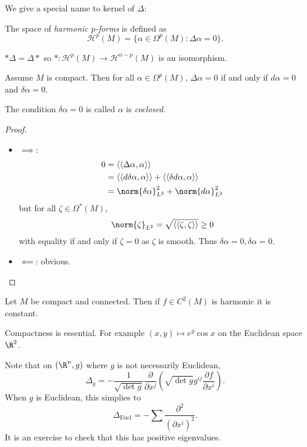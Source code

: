 \documentclass[a4paper]{article}
\begin{document}
We give a special name to kernel of \(\Delta\):

\begin{definition}
  The space of \emph{harmonic \(p\)-forms} is defined as
  \[
    \mathcal H^p(M) = \{\alpha \in \Omega^p(M): \Delta \alpha = 0\}.
  \]
\end{definition}

\begin{note}
  \(* \Delta = \Delta *\) so \(*: \mathcal H^p(M) \to \mathcal H^{n - p}(M)\) is an isomorphism.
\end{note}

\begin{proposition}
  Assume \(M\) is compact. Then for all \(\alpha \in \Omega^p(M)\), \(\Delta \alpha = 0\) if and only if \(d \alpha = 0\) and \(\delta \alpha = 0\).
\end{proposition}

The condition \(\delta \alpha = 0\) is called \(\alpha\) is \emph{coclosed}.

\begin{proof}\leavevmode
  \begin{itemize}
  \item \(\implies\):
    \begin{align*}
      0
      &= \langle\langle \Delta\alpha, \alpha \rangle\rangle \\
      &= \langle\langle d \delta \alpha, \alpha \rangle\rangle + \langle\langle \delta d \alpha, \alpha \rangle\rangle \\
      &= \norm{\delta \alpha}^2_{L^2} + \norm{d \alpha}^2_{L^2}
    \end{align*}
    but for all \(\zeta \in \Omega^*(M)\),
    \[
      \norm{\zeta}_{L^2} = \sqrt{\langle\langle \zeta, \zeta \rangle\rangle} \geq 0
    \]
    with equality if and only if \(\zeta = 0\) as \(\zeta\) is smooth. Thus \(\delta \alpha = 0, \delta \alpha = 0\).
  \item \(\impliedby\): obvious.
  \end{itemize}
\end{proof}

\begin{corollary}
  Let \(M\) be compact and connected. Then if \(f \in C^2(M)\) is harmonic it is constant.
\end{corollary}

\begin{note}
  Compactness is essential. For example \((x, y) \mapsto e^y \cos x\) on the Euclidean space \(\R^2\).

  Note that on \((\R^n, g)\) where \(g\) is not necessarily Euclidean,
  \[
    \Delta_g = - \frac{1}{\sqrt{\det g}} \frac{\partial  }{\partial x^j} \left(\sqrt{\det g} g^{ij} \frac{\partial f}{\partial x^i} \right).
  \]
  When \(g\) is Euclidean, this simplies to
  \[
    \Delta_{\text{Eucl}} = - \sum \frac{\partial^2}{(\partial x^i)^2}.
  \]
  It is an exercise to check that this has positive eigenvalues.
\end{note}
\end{document}
